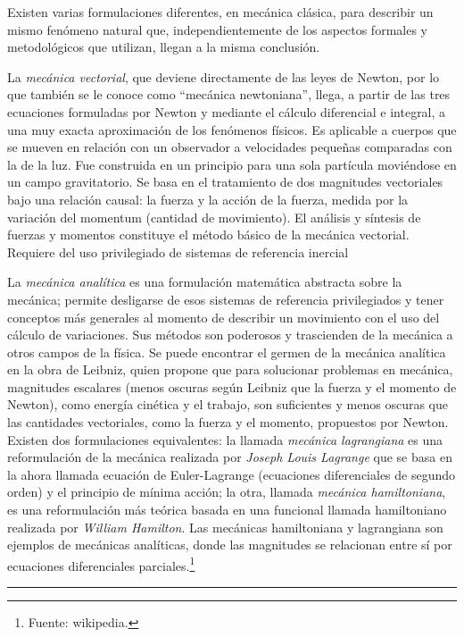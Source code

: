 Existen varias formulaciones diferentes, en mecánica clásica, para describir un mismo fenómeno natural que, independientemente de los aspectos formales y metodológicos que utilizan, llegan a la misma conclusión.

La \emph{mecánica vectorial}, que deviene directamente de las leyes de Newton, por lo que también se le conoce como ``mecánica newtoniana'', llega, a partir de las tres ecuaciones formuladas por Newton y mediante el cálculo diferencial e integral, a una muy exacta aproximación de los fenómenos físicos. Es aplicable a cuerpos que se mueven en relación con un observador a velocidades pequeñas comparadas con la de la luz. Fue construida en un principio para una sola partícula moviéndose en un campo gravitatorio. Se basa en el tratamiento de dos magnitudes vectoriales bajo una relación causal: la fuerza y la acción de la fuerza, medida por la variación del momentum (cantidad de movimiento). El análisis y síntesis de fuerzas y momentos constituye el método básico de la mecánica vectorial. Requiere del uso privilegiado de sistemas de referencia inercial

La \emph{mecánica analítica} es una formulación matemática abstracta sobre la mecánica; permite desligarse de esos sistemas de referencia privilegiados y tener conceptos más generales al momento de describir un movimiento con el uso del cálculo de variaciones. Sus métodos son poderosos y trascienden de la mecánica a otros campos de la física. Se puede encontrar el germen de la mecánica analítica en la obra de Leibniz, quien propone que para solucionar problemas en mecánica, magnitudes escalares (menos oscuras según Leibniz que la fuerza y el momento de Newton), como energía cinética y el trabajo, son suficientes y menos oscuras que las cantidades vectoriales, como la fuerza y el momento, propuestos por Newton. Existen dos formulaciones equivalentes: la llamada \emph{mecánica lagrangiana} es una reformulación de la mecánica realizada por \emph{Joseph Louis Lagrange} que se basa en la ahora llamada ecuación de Euler-Lagrange (ecuaciones diferenciales de segundo orden) y el principio de mínima acción; la otra, llamada \emph{mecánica hamiltoniana}, es una reformulación más teórica basada en una funcional llamada hamiltoniano realizada por \emph{William Hamilton}. Las mecánicas hamiltoniana y lagrangiana son ejemplos de mecánicas analíticas, donde las magnitudes se relacionan entre sí por ecuaciones diferenciales parciales.\footnote{Fuente: wikipedia.}

\rule{250pt}{0.1pt}

